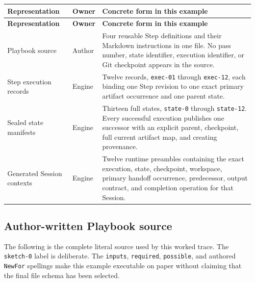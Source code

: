 \documentclass[11pt]{article}
\newcommand{\artifact}[1]{\texttt{#1}}
\begin{document}
\begin{longtable}{@{}L{1.34in}L{0.82in}L{4.38in}@{}}
\toprule
\textbf{Representation} & \textbf{Owner} & \textbf{Concrete form in this example} \\
\midrule
\endfirsthead
\toprule
\textbf{Representation} & \textbf{Owner} & \textbf{Concrete form in this example} \\
\midrule
\endhead
Playbook source & Author & Four reusable Step definitions and their Markdown instructions in one file. No pass number, state identifier, execution identifier, or Git checkpoint appears in the source. \\
Step execution records & Engine & Twelve records, \texttt{exec-01} through \texttt{exec-12}, each binding one Step revision to one exact primary artifact occurrence and one parent state. \\
Sealed state manifests & Engine & Thirteen full states, \texttt{state-0} through \texttt{state-12}. Every successful execution publishes one successor with an explicit parent, checkpoint, full current artifact map, and creating provenance. \\
Generated Session contexts & Engine & Twelve runtime preambles containing the exact execution, state, checkpoint, workspace, primary handoff occurrence, predecessor, output contract, and completion operation for that Session. \\
\bottomrule
\end{longtable}

\subsection{Author-written Playbook source}

The following is the complete literal source used by this worked trace. The
\texttt{sketch-0} label is deliberate. The \texttt{inputs},
\texttt{required}, \texttt{possible}, and authored \artifact{NewFor} spellings
make this example executable on paper without claiming that the final file
schema has been selected.


\end{document}
